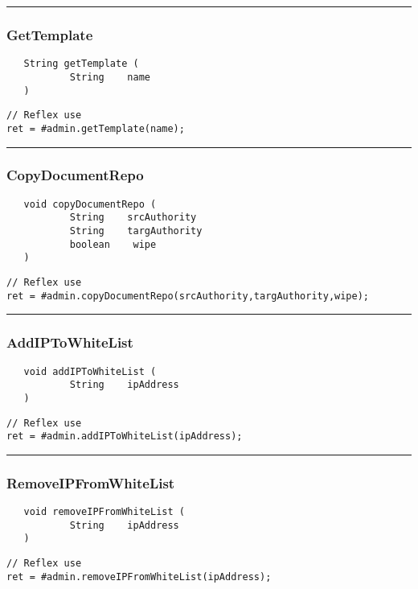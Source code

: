 \rule{15cm}{2pt}
\subsubsection{GetTemplate}
\label{Api:GetTemplate}
\begin{verbatim}
   String getTemplate (
           String    name
   )
\end{verbatim}
\begin{lstlisting}[language=reflex]
// Reflex use
ret = #admin.getTemplate(name);
\end{lstlisting}



\rule{15cm}{2pt}
\subsubsection{CopyDocumentRepo}
\label{Api:CopyDocumentRepo}
\begin{verbatim}
   void copyDocumentRepo (
           String    srcAuthority
           String    targAuthority
           boolean    wipe
   )
\end{verbatim}
\begin{lstlisting}[language=reflex]
// Reflex use
ret = #admin.copyDocumentRepo(srcAuthority,targAuthority,wipe);
\end{lstlisting}



\rule{15cm}{2pt}
\subsubsection{AddIPToWhiteList}
\label{Api:AddIPToWhiteList}
\begin{verbatim}
   void addIPToWhiteList (
           String    ipAddress
   )
\end{verbatim}
\begin{lstlisting}[language=reflex]
// Reflex use
ret = #admin.addIPToWhiteList(ipAddress);
\end{lstlisting}



\rule{15cm}{2pt}
\subsubsection{RemoveIPFromWhiteList}
\label{Api:RemoveIPFromWhiteList}
\begin{verbatim}
   void removeIPFromWhiteList (
           String    ipAddress
   )
\end{verbatim}
\begin{lstlisting}[language=reflex]
// Reflex use
ret = #admin.removeIPFromWhiteList(ipAddress);
\end{lstlisting}



